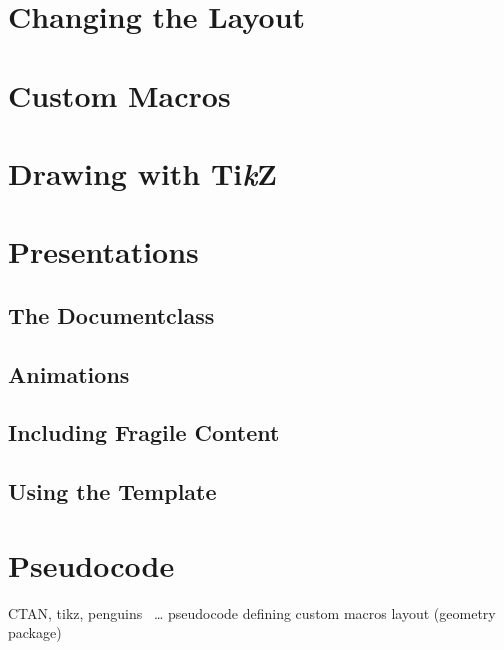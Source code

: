 \section{Changing the Layout}
\begin{frame}

\end{frame}

\section{Custom Macros}
\begin{frame}

\end{frame}

\section{Drawing with Ti\textit{k}Z}
\begin{frame}

\end{frame}

\section{Presentations}

\subsection{The  Documentclass}
\begin{frame}

\end{frame}

\subsection{Animations}
\begin{frame}

\end{frame}

\subsection{Including Fragile Content}
\begin{frame}

\end{frame}

\subsection{Using the  Template}
\begin{frame}

\end{frame}

\section{Pseudocode}
\begin{frame}
   CTAN, tikz, penguins ~\ldots
   pseudocode
   defining custom macros
   layout (geometry package)
\end{frame}